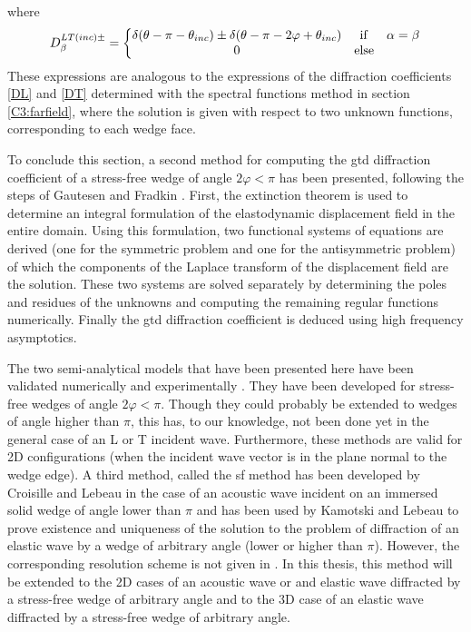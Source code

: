 where
\begin{equation}
D_{\beta}^{LT(inc)\pm}= \left\{
\begin{matrix}
\delta(\theta-\pi-\theta_{inc})\pm\delta(\theta-\pi-2\varphi+\theta_{inc}) & \rm if & \alpha=\beta \\
0 & \rm else
\end{matrix}
\right.
\end{equation}
These expressions are analogous to the expressions of the diffraction coefficients \eqref{DL} and \eqref{DT} determined with the spectral functions method in section \ref{C3:farfield}, where the solution is given with respect to two unknown functions, corresponding to each wedge face.

To conclude this section, a second method for computing the \acrshort{gtd} diffraction coefficient of a stress-free wedge of angle $2\varphi<\pi$ has been presented, following the steps of Gautesen and Fradkin \cite{GautesenFradkin}. First, the extinction theorem is used to determine an integral formulation of the elastodynamic displacement field in the entire domain. Using this formulation, two functional systems of equations are derived (one for the symmetric problem and one for the antisymmetric problem) of which the components of the Laplace transform of the displacement field are the solution. These two systems are solved separately by determining the poles and residues of the unknowns and computing the remaining regular functions numerically. Finally the \acrshort{gtd} diffraction coefficient is deduced using high frequency asymptotics.

The two semi-analytical models that have been presented here have been validated numerically \cite{GautesenFradkin} and experimentally \cite{ChapmanBurch}. They have been developed for stress-free wedges of angle $2\varphi<\pi$. Though they could probably be extended to wedges of angle higher than $\pi$, this has, to our knowledge, not been done yet in the general case of an L or T incident wave. Furthermore, these methods are valid for 2D configurations (when the incident wave vector is in the plane normal to the wedge edge). A third method, called the \acrfull{sf} method has been developed by Croisille and Lebeau \cite{CroisilleLebeau} in the case of an acoustic wave incident on an immersed solid wedge of angle lower than $\pi$ and has been used by Kamotski and Lebeau \cite{KamotskiLebeau} to prove existence and uniqueness of the solution to the problem of diffraction of an elastic wave by a wedge of arbitrary angle (lower or higher than $\pi$). However, the corresponding resolution scheme is not given in \cite{KamotskiLebeau}. In this thesis, this method will be extended to the 2D cases of an acoustic wave or and elastic wave diffracted by a stress-free wedge of arbitrary angle and to the 3D case of an elastic wave diffracted by a stress-free wedge of arbitrary angle.

